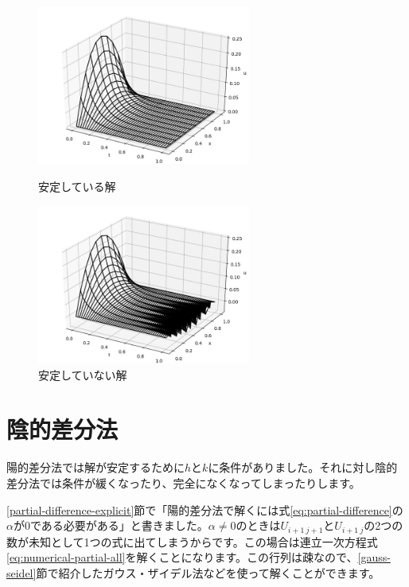 \begin{figure}[ht!]
 \begin{minipage}{0.45\hsize}
  \begin{center}
   \includegraphics[width=7cm]{img/5-stability1.png}
  \end{center}
  \caption{安定している解}
  \label{fig:stability-1}
 \end{minipage}
 \begin{minipage}{0.5\hsize}
  \begin{center}
   \includegraphics[width=7cm]{img/5-stability2.png}
  \end{center}
  \caption{安定していない解}
  \label{fig:stability-2}
 \end{minipage}
\end{figure}









\section{陰的差分法}
\label{partial-difference-implicit}
陽的差分法では解が安定するために$h$と$k$に条件がありました。それに対し陰的差分法では条件が緩くなったり、完全になくなってしまったりします。

\ref{partial-difference-explicit}節で「陽的差分法で解くには式\ref{eq:partial-difference}の$\alpha$が0である必要がある」と書きました。$\alpha\neq0$のときは$U_{i+1\ j+1}$と$U_{i+1\ j}$の2つの数が未知として1つの式に出てしまうからです。この場合は連立一次方程式\ref{eq:numerical-partial-all}を解くことになります。この行列は疎なので、\ref{gauss-seidel}節で紹介したガウス・ザイデル法などを使って解くことができます。

